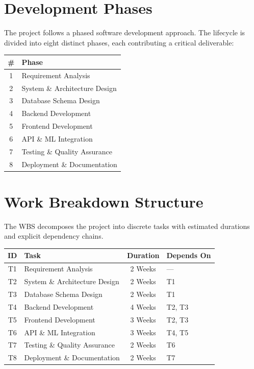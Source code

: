 \documentclass[12pt,a4paper]{article}
\begin{document}
\section{Development Phases}
The project follows a phased software development approach. The lifecycle is divided into eight distinct phases, each contributing a critical deliverable:

\begin{center}
\begin{tabular}{cl}
\toprule
\textbf{\#} & \textbf{Phase} \\
\midrule
1 & Requirement Analysis \\
2 & System \& Architecture Design \\
3 & Database Schema Design \\
4 & Backend Development \\
5 & Frontend Development \\
6 & API \& ML Integration \\
7 & Testing \& Quality Assurance \\
8 & Deployment \& Documentation \\
\bottomrule
\end{tabular}
\end{center}

\section{Work Breakdown Structure}
The WBS decomposes the project into discrete tasks with estimated durations and explicit dependency chains.

\bigskip
\begin{center}
\begin{tabular}{c l c l}
\toprule
\textbf{ID} & \textbf{Task} & \textbf{Duration} & \textbf{Depends On} \\
\midrule
T1 & Requirement Analysis & 2 Weeks & --- \\
T2 & System \& Architecture Design & 2 Weeks & T1 \\
T3 & Database Schema Design & 2 Weeks & T1 \\
T4 & Backend Development & 4 Weeks & T2, T3 \\
T5 & Frontend Development & 3 Weeks & T2, T3 \\
T6 & API \& ML Integration & 3 Weeks & T4, T5 \\
T7 & Testing \& Quality Assurance & 2 Weeks & T6 \\
T8 & Deployment \& Documentation & 2 Weeks & T7 \\
\bottomrule
\end{tabular}
\end{center}
\end{document}
